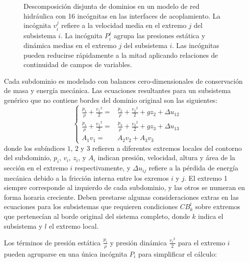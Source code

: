 \begin{figure}[ht]
\caption[Descomposición disjunta de dominios en el modelado de redes hidráulicas]
{Descomposición disjunta de dominios en un modelo de red hidráulica con 16 incógnitas en las interfaces de acoplamiento.
La incógnita $v_{i}^{j}$ refiere a la velocidad media en el extremo $j$ del subsistema $i$.
La incógnita $P_{i}^{j}$ agrupa las presiones estática y dinámica medias en el extremo $j$ del subsistema $i$.
Las incógnitas pueden reducirse rápidamente a la mitad aplicando relaciones de continuidad de campos de variables.}
\label{net16}
\end{figure}

Cada subdominio es modelado con balances cero-dimensionales de conservación de masa y energía mecánica.
Las ecuaciones resultantes para un subsistema genérico que no contiene bordes del dominio original son las siguientes:
\begin{equation}
\left \{
\begin{array}{rl}
\frac{p_1}{\rho} + \frac{{v_1}^2}{2} =& \frac{p_2}{\rho} + \frac{{v_2}^2}{2} + gz_2 + \Delta u_{12} \\
\frac{p_1}{\rho} + \frac{{v_1}^2}{2} =& \frac{p_3}{\rho} + \frac{{v_3}^2}{2} + gz_3 + \Delta u_{13} \\
A_1 v_1 =& A_2 v_2 + A_3 v_3
\end{array}
\right .
\label{net-eq}
\end{equation}
donde los subíndices $1$, $2$ y $3$ refieren a diferentes extremos locales del contorno del subdominio,
$p_i$, $v_i$, $z_i$, y $A_i$ indican {presión}, {velocidad}, {altura} y {área} de la sección en el extremo $i$ respectivamente,
y $\Delta u_{ij}$ refiere a la pérdida de energía mecánica debido a la fricción interna entre los exremos $i$ y $j$.
El extremo 1 siempre corresponde al izquierdo de cada subdominio, y las otros se numeran en forma horaria creciente.
Deben prestarse algunas consideraciones extras en las ecuaciones para los subsistemas que requieren condiciones $CB_{k}^{l}$ sobre extremos que pertenecían al borde original del sistema completo,
donde $k$ indica el subsistema y $l$ el extremo local.

Los términos de presión estática $\frac{p_i}{\rho}$ y presión dinámica $\frac{{v_i}^2}{2}$ para el extremo $i$ pueden agruparse en una única incógnita $P_i$ para simplificar el cálculo:

